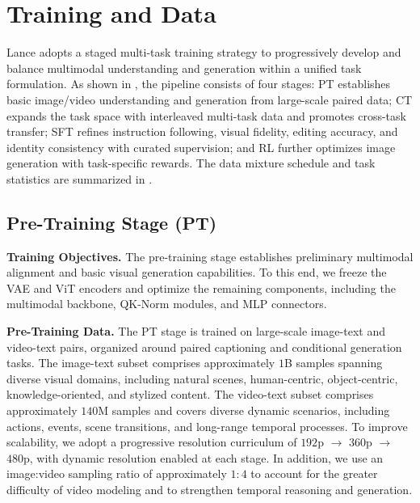 \section{Training and Data}
\label{sec:training_data}

Lance adopts a staged multi-task training strategy to progressively develop and balance multimodal understanding and generation within a unified task formulation. As shown in , the pipeline consists of four stages: PT establishes basic image/video understanding and generation from large-scale paired data; CT expands the task space with interleaved multi-task data and promotes cross-task transfer; SFT refines instruction following, visual fidelity, editing accuracy, and identity consistency with curated supervision; and RL further optimizes image generation with task-specific rewards. The data mixture schedule and task statistics are summarized in .


\subsection{Pre-Training Stage (PT)}

\textbf{Training Objectives.}
The pre-training stage establishes preliminary multimodal alignment and basic visual generation capabilities. To this end, we freeze the VAE and ViT encoders and optimize the remaining components, including the multimodal backbone, QK-Norm modules, and MLP connectors.

\textbf{Pre-Training Data.}
The PT stage is trained on large-scale image-text and video-text pairs, organized around paired captioning and conditional generation tasks. The image-text subset comprises approximately $1$B samples spanning diverse visual domains, including natural scenes, human-centric, object-centric, knowledge-oriented, and stylized content. The video-text subset comprises approximately $140$M samples and covers diverse dynamic scenarios, including actions, events, scene transitions, and long-range temporal processes. 
To improve scalability, we adopt a progressive resolution curriculum of $192$p \(\rightarrow\) $360$p \(\rightarrow\) $480$p, with dynamic resolution enabled at each stage. In addition, we use an image:video sampling ratio of approximately $1:4$ to account for the greater difficulty of video modeling and to strengthen temporal reasoning and generation.

\vspace{0.5em}

